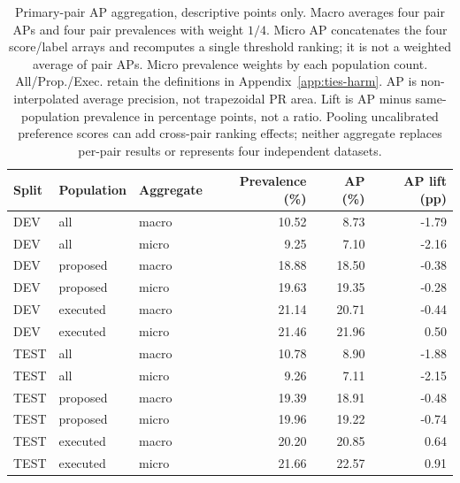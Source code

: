 \begin{table}[htbp]
\centering\footnotesize\setlength{\tabcolsep}{3pt}
\caption{Primary-pair AP aggregation, descriptive points only. Macro averages four pair APs and four pair prevalences with weight $1/4$. Micro AP concatenates the four score/label arrays and recomputes a single threshold ranking; it is not a weighted average of pair APs. Micro prevalence weights by each population count. All/Prop./Exec. retain the definitions in Appendix~\ref{app:ties-harm}. AP is non-interpolated average precision, not trapezoidal PR area. Lift is AP minus same-population prevalence in percentage points, not a ratio. Pooling uncalibrated preference scores can add cross-pair ranking effects; neither aggregate replaces per-pair results or represents four independent datasets.}
\label{tab:coverage-ap}
\begin{tabular}{lllrrr}
\toprule
Split & Population & Aggregate & Prevalence (\%) & AP (\%) & AP lift (pp)\\
\midrule
DEV & all & macro & 10.52 & 8.73 & -1.79\\
DEV & all & micro & 9.25 & 7.10 & -2.16\\
DEV & proposed & macro & 18.88 & 18.50 & -0.38\\
DEV & proposed & micro & 19.63 & 19.35 & -0.28\\
DEV & executed & macro & 21.14 & 20.71 & -0.44\\
DEV & executed & micro & 21.46 & 21.96 & 0.50\\
TEST & all & macro & 10.78 & 8.90 & -1.88\\
TEST & all & micro & 9.26 & 7.11 & -2.15\\
TEST & proposed & macro & 19.39 & 18.91 & -0.48\\
TEST & proposed & micro & 19.96 & 19.22 & -0.74\\
TEST & executed & macro & 20.20 & 20.85 & 0.64\\
TEST & executed & micro & 21.66 & 22.57 & 0.91\\
\bottomrule
\end{tabular}
\end{table}
